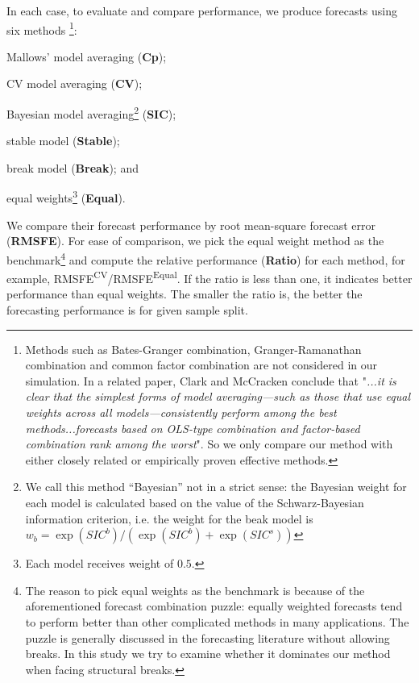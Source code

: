 In each case, to evaluate and compare performance, we produce forecasts using six methods \footnote{Methods such as Bates-Granger combination, Granger-Ramanathan combination and common factor combination are not considered in our simulation. In a related paper, Clark and McCracken \cite{clark_mccracken_averagingVAR_2008} conclude that "\emph{...it is clear that the simplest forms of model averaging---such as those that use equal weights across all models---consistently perform among the best methods...forecasts based on OLS-type combination and factor-based combination rank among the worst}". So we only compare our method with either closely related or empirically proven effective methods.}:
\begin{inparaenum}[(i)]
\item Mallows' model averaging (\textbf{Cp});
\item CV model averaging (\textbf{CV});
\item Bayesian model averaging\footnote{We call this method ``Bayesian'' not in a strict sense: the Bayesian weight for each model is calculated based on the value of the Schwarz-Bayesian information criterion, i.e. the weight for the beak model is $w_{b} = \exp{(SIC^{b})}/(\exp{(SIC^{b})} + \exp{(SIC^{s})})$} (\textbf{SIC});
\item stable model (\textbf{Stable});
\item break model (\textbf{Break}); and
\item equal weights\footnote{Each model receives weight of $0.5$.} (\textbf{Equal}).
\end{inparaenum}
We compare their forecast performance by root mean-square forecast error (\textbf{RMSFE}). For ease of comparison, we pick the equal weight method as the benchmark\footnote{The reason to pick equal weights as the benchmark is because of the aforementioned forecast combination puzzle: equally weighted forecasts tend to perform better than other complicated methods in many applications. The puzzle is generally discussed in the forecasting literature without allowing breaks. In this study we try to examine whether it dominates our method when facing structural breaks.} and compute the relative performance (\textbf{Ratio}) for each method, for example, RMSFE\textsuperscript{CV}/RMSFE\textsuperscript{Equal}. If the ratio is less than one, it indicates better performance than equal weights. The smaller the ratio is, the better the forecasting performance is for given sample split.
